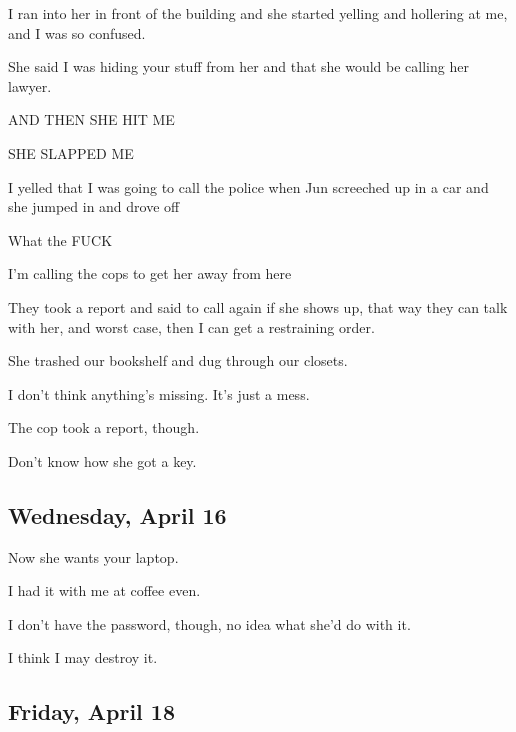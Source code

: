 { I ran into her in front of the building and she started yelling and hollering at me, and I was so confused.

 She said I was hiding your stuff from her and that she would be calling her lawyer.

 AND THEN SHE HIT ME

 SHE SLAPPED ME

 I yelled that I was going to call the police when Jun screeched up in a car and she jumped in and drove off

 What the FUCK

 I'm calling the cops to get her away from here

 They took a report and said to call again if she shows up, that way they can talk with her, and worst case, then I can get a restraining order.

 She trashed our bookshelf and dug through our closets.

 I don't think anything's missing. It's just a mess.

 The cop took a report, though.

 Don't know how she got a key.

\newpage

\subsection*{Wednesday, April 16}\label{wednesday-april-16}

 Now she wants your laptop.

 I had it with me at coffee even.

 I don't have the password, though, no idea what she'd do with it.

 I think I may destroy it.

\newpage

\subsection*{Friday, April 18}\label{friday-april-18}

}
